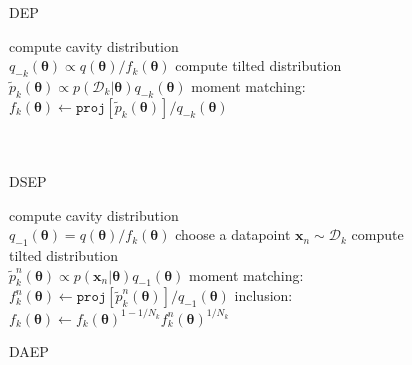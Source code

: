 \documentclass{article} %
\begin{document}
\begin{figure}[!t]
\begin{minipage}[t]{0.33\linewidth}
\centering
\begin{algorithm}[H] 
\caption{DEP} \small
\label{alg:dep} 
\begin{algorithmic}[1]
	\STATE compute cavity distribution \\$q_{-k}(\bm{\theta}) \propto q(\bm{\theta}) / f_k(\bm{\theta})$ 
	\STATE compute tilted distribution \\$\tilde{p}_k(\bm{\theta}) \propto p(\mathcal{D}_k|\bm{\theta}) q_{-k}(\bm{\theta})$
	\STATE moment matching: \\ \hspace{-3mm}$f_k(\bm{\theta}) \leftarrow \mathtt{proj}[\tilde{p}_k(\bm{\theta})] / q_{-k}(\bm{\theta}) $ \\
\hspace{1mm}\\ \vspace{1.5mm} \hspace{1mm}\\
\end{algorithmic}
\end{algorithm}
\end{minipage}
%
\begin{minipage}[t]{0.33\linewidth}
\centering
\begin{algorithm}[H] 
\caption{DSEP} \small
\label{alg:dsep} 
\begin{algorithmic}[1] 
	\STATE compute cavity distribution \\$q_{-1}(\bm{\theta}) = q(\bm{\theta}) / f_k(\bm{\theta})$
	\STATE choose a datapoint $\bm{x}_n \sim \mathcal{D}_k$
	\STATE compute tilted distribution \\$\tilde{p}_k^n(\bm{\theta}) \propto p(\bm{x}_n|\bm{\theta}) q_{-1}(\bm{\theta})$
	\STATE moment matching: \\ \hspace{-1mm}$f_k^n(\bm{\theta}) \leftarrow \mathtt{proj}[\tilde{p}_k^n(\bm{\theta})] / q_{-1}(\bm{\theta}) $
	\STATE inclusion:\\ \hspace{-5mm} $f_k(\bm{\theta}) \leftarrow f_k(\bm{\theta})^{1 - 1/N_k} f_k^n(\bm{\theta})^{1/N_k}$
\end{algorithmic}
\end{algorithm}
\end{minipage}
\begin{minipage}[t]{0.33\linewidth}
\centering
\begin{algorithm}[H]
\caption{DAEP} \small
\label{alg:daep} 
\begin{algorithmic}[1] 


\end{algorithmic}
\end{algorithm}
\end{minipage}
\end{figure}
\end{document}

